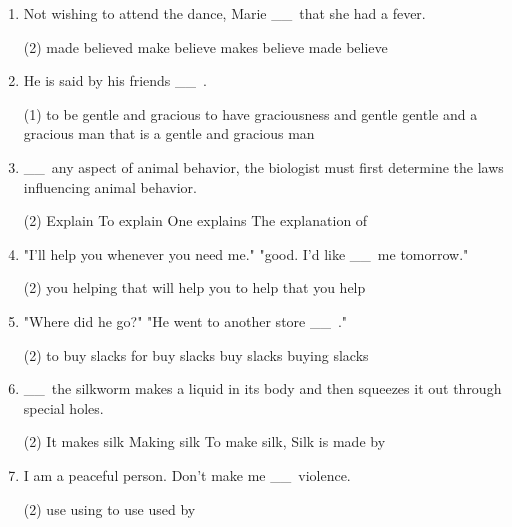 \documentclass{yufa}
\newcommand\ttu{ \_\_\ }
\begin{document}
\begin{enumerate}
\item Not wishing to attend the dance, Marie \ttu that she had a fever.
  \begin{tasks}(2)
    \task made believed
    \task make believe
    \task makes believe
    \task made believe
  \end{tasks}

\item He is said by his friends \ttu.
  \begin{tasks}(1)
    \task to be gentle and gracious
    \task to have graciousness and gentle
    \task gentle and a gracious man
    \task that is a gentle and gracious man
  \end{tasks}

\item \ttu any aspect of animal behavior, the biologist must first determine the laws influencing animal behavior.
  \begin{tasks}(2)
    \task Explain
    \task To explain
    \task One explains
    \task The explanation of
  \end{tasks}

\item "I'll help you whenever you need me." "good. I'd like \ttu me tomorrow."
  \begin{tasks}(2)
    \task you helping
    \task that will help
    \task you to help
    \task that you help
  \end{tasks}

\item "Where did he go?" "He went to another store \ttu ."
  \begin{tasks}(2)
    \task to buy slacks
    \task for buy slacks
    \task buy slacks
    \task buying slacks
  \end{tasks}

\item \ttu the silkworm makes a liquid in its body and then squeezes it out through special holes.
  \begin{tasks}(2)
    \task It makes silk
    \task Making silk
    \task To make silk,
    \task Silk is made by
  \end{tasks}

\item I am a peaceful person. Don't make me \ttu violence.
  \begin{tasks}(2)
    \task use
    \task using
    \task to use
    \task used by
  \end{tasks}


\end{enumerate}
\end{document}
